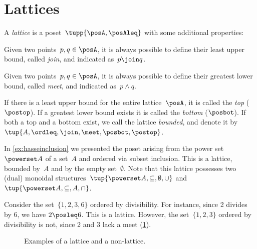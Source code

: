 

\section{Lattices}

\begin{definition}[Lattice]
  \label{def:lattice}
  A \emph{lattice} is a poset~$\tupp{\posA,\posAleq}$ with some additional properties:
  \begin{compactenum}
    \item Given two points~$p, q \in \posA$, it is always possible to define their least upper bound, called \emph{join}, and indicated as~$p \join q$.
    \item Given two points~$p, q \in \posA$, it is always possible to define their greatest lower bound, called \emph{meet}, and indicated as~$p \wedge q$.
  \end{compactenum}
\end{definition}


\begin{remark}
  \label{def:top}
  \label{def:bot}
  If there is a least upper bound for the entire lattice~$\posA$, it is called
  the \emph{top} ($\postop$). If a greatest lower bound exists it is called the \emph{bottom} ($\posbot$). If both a top and a bottom exist, we call the lattice \emph{bounded}, and denote it by~$\tup{A,\ordleq,\join,\meet,\posbot,\postop}$.
\end{remark}

\begin{example}
  In \cref{ex:hasseinclusion} we presented the poset arising from the power set~$\powerset A$ of a set~$A$ and ordered via subset inclusion. This is a lattice, bounded by~$A$ and by the empty set~$\emptyset$. Note that this lattice possesses two (dual) monoidal structures~$\tup{\powerset A,\subseteq,\emptyset,\cup}$ and~$\tup{\powerset A,\subseteq,A,\cap}$.
\end{example}

\begin{example}
  Consider the set~$\{1,2,3,6\}$ ordered by divisibility. For instance, since 2 divides by 6, we have $2\posleq 6$. This is a lattice. However, the set~$\{1,2,3\}$ ordered by divisibility is not, since 2 and 3 lack a meet (\cref{fig:exlattice}).
  \begin{figure}[h!]
    \begin{center}
    \end{center}
    \caption{Examples of a lattice and a non-lattice. \label{fig:exlattice}}
  \end{figure}
\end{example}

